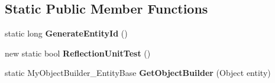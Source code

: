 \subsection*{Static Public Member Functions}
\begin{DoxyCompactItemize}
\item 
\hypertarget{class_s_e_mod_a_p_i_internal_1_1_a_p_i_1_1_entity_1_1_base_entity_a031c571853381bfa3cdf9dfe2546ae4b}{}static long {\bfseries Generate\+Entity\+Id} ()\label{class_s_e_mod_a_p_i_internal_1_1_a_p_i_1_1_entity_1_1_base_entity_a031c571853381bfa3cdf9dfe2546ae4b}

\item 
\hypertarget{class_s_e_mod_a_p_i_internal_1_1_a_p_i_1_1_entity_1_1_base_entity_a11e9d97bf41c51782e63010f8a4717d0}{}new static bool {\bfseries Reflection\+Unit\+Test} ()\label{class_s_e_mod_a_p_i_internal_1_1_a_p_i_1_1_entity_1_1_base_entity_a11e9d97bf41c51782e63010f8a4717d0}

\item 
\hypertarget{class_s_e_mod_a_p_i_internal_1_1_a_p_i_1_1_entity_1_1_base_entity_a66da2de255b6a822f0b4c44688a1fd69}{}static My\+Object\+Builder\+\_\+\+Entity\+Base {\bfseries Get\+Object\+Builder} (Object entity)\label{class_s_e_mod_a_p_i_internal_1_1_a_p_i_1_1_entity_1_1_base_entity_a66da2de255b6a822f0b4c44688a1fd69}

\end{DoxyCompactItemize}
